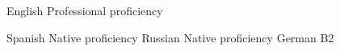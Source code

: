 
\begin{cvskills}

  \cvskill
    {English} %
    {Professional proficiency} %

  \cvskill
    {Spanish} %
    {Native proficiency} %
  \cvskill
    {Russian} %
    {Native proficiency} %
  \cvskill
    {German} %
    {B2} %

\end{cvskills}
